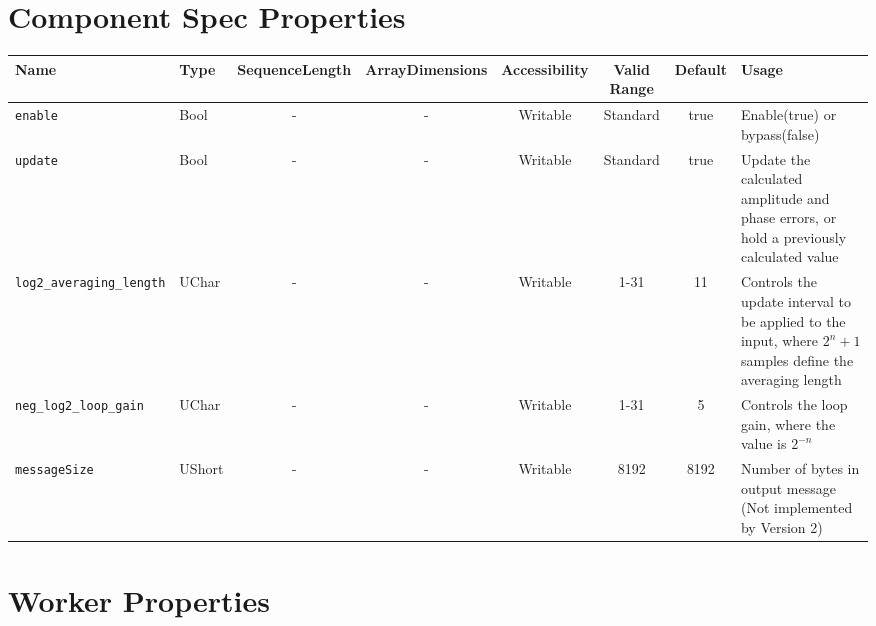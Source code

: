 \begin{landscape}
\section*{Component Spec Properties}
	\begin{scriptsize}
		\begin{tabular}{|p{3cm}|p{1.5cm}|c|c|c|c|c|p{7cm}|}
			\hline
			\rowcolor{blue}
			Name                         & Type   & SequenceLength & ArrayDimensions & Accessibility      & Valid Range & Default & Usage                                                                                                      \\
			\hline
			\verb+enable+                & Bool   & -              & -               & Writable & Standard    & true    & Enable(true) or bypass(false) \\
			\hline
			\verb+update+                & Bool   & -              & -               & Writable & Standard    & true    & Update the calculated amplitude and phase errors, or hold a previously calculated value                    \\
			\hline
			\verb+log2_averaging_length+ & UChar  & -              & -               & Writable & 1-31        & 11      & Controls the update interval to be applied to the input, where $2^n+1$ samples define the averaging length \\
			\hline
			\verb+neg_log2_loop_gain+    & UChar  & -              & -               & Writable & 1-31        & 5       & Controls the loop gain, where the value is $2^{-n}$                                                        \\
			\hline
			\verb+messageSize+           & UShort & -              & -               & Writable & 8192        & 8192    & Number of bytes in output message (Not implemented by Version 2)\\
			\hline
		\end{tabular}
	\end{scriptsize}

\section*{Worker Properties}

\end{landscape}
